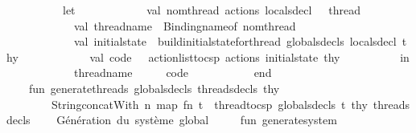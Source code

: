 \begin{isabellebody}
\ \ \ \ \ \ \ \ \ \ let\isanewline
\ \ \ \ \ \ \ \ \ \ \ \ val\ {\isacharbraceleft}{\kern0pt}nom{\isacharunderscore}{\kern0pt}thread{\isacharcomma}{\kern0pt}\ actions{\isacharcomma}{\kern0pt}\ locals{\isacharunderscore}{\kern0pt}decl{\isacharcomma}{\kern0pt}\ {\isachardot}{\kern0pt}{\isachardot}{\kern0pt}{\isachardot}{\kern0pt}{\isacharbraceright}{\kern0pt}\ {\isacharequal}{\kern0pt}\ thread\isanewline
\ \ \ \ \ \ \ \ \ \ \ \ val\ thread{\isacharunderscore}{\kern0pt}name\ {\isacharequal}{\kern0pt}\ Binding{\isachardot}{\kern0pt}name{\isacharunderscore}{\kern0pt}of\ nom{\isacharunderscore}{\kern0pt}thread\isanewline
\ \ \ \ \ \ \ \ \isanewline
\ \ \ \ \ \ \ \ \ \ \ \ val\ initial{\isacharunderscore}{\kern0pt}state\ {\isacharequal}{\kern0pt}\ build{\isacharunderscore}{\kern0pt}initial{\isacharunderscore}{\kern0pt}state{\isacharunderscore}{\kern0pt}for{\isacharunderscore}{\kern0pt}thread\ globals{\isacharunderscore}{\kern0pt}decls\ locals{\isacharunderscore}{\kern0pt}decl\ thy\isanewline
\ \ \ \ \ \ \ \ \ \ \ \ val\ {\isacharparenleft}{\kern0pt}code{\isacharcomma}{\kern0pt}\ {\isacharunderscore}{\kern0pt}{\isacharparenright}{\kern0pt}\ {\isacharequal}{\kern0pt}\ action{\isacharunderscore}{\kern0pt}list{\isacharunderscore}{\kern0pt}to{\isacharunderscore}{\kern0pt}csp\ actions\ initial{\isacharunderscore}{\kern0pt}state\ thy\isanewline
\ \ \ \ \ \ \ \ \ \ in\isanewline
\ \ \ \ \ \ \ \ \ \ \ \ thread{\isacharunderscore}{\kern0pt}name\ {\isacharcircum}{\kern0pt}\ {\isachardoublequote}{\kern0pt}\ {\isacharequal}{\kern0pt}\ {\isachardoublequote}{\kern0pt}\ {\isacharcircum}{\kern0pt}\ code\ \isanewline
\ \ \ \ \ \ \ \ \ \ end\isanewline
\ \ \ \ \ \ \ \ \ \ \isanewline
\ \ \ \ fun\ generate{\isacharunderscore}{\kern0pt}threads\ globals{\isacharunderscore}{\kern0pt}decls\ threads{\isacharunderscore}{\kern0pt}decls\ thy\ {\isacharequal}{\kern0pt}\isanewline
\ \ \ \ \ \ \ \ String{\isachardot}{\kern0pt}concatWith\ {\isachardoublequote}{\kern0pt}{\isacharbackslash}{\kern0pt}n{\isachardoublequote}{\kern0pt}\ {\isacharparenleft}{\kern0pt}map\ {\isacharparenleft}{\kern0pt}fn\ t\ {\isacharequal}{\kern0pt}{\isachargreater}{\kern0pt}\ thread{\isacharunderscore}{\kern0pt}to{\isacharunderscore}{\kern0pt}csp\ globals{\isacharunderscore}{\kern0pt}decls\ t\ thy{\isacharparenright}{\kern0pt}\ threads{\isacharunderscore}{\kern0pt}decls{\isacharparenright}{\kern0pt}\isanewline
\isanewline
\ \ \ \ {\isacharparenleft}{\kern0pt}{\isacharasterisk}{\kern0pt}Génération\ du\ système\ global\ {\isacharasterisk}{\kern0pt}{\isacharparenright}{\kern0pt}\isanewline
\ \ \ \ fun\ generate{\isacharunderscore}{\kern0pt}system\ {\isacharparenleft}{\kern0pt}{\isacharparenright}{\kern0pt}\ {\isacharequal}{\kern0pt}\isanewline

\end{isabellebody}
